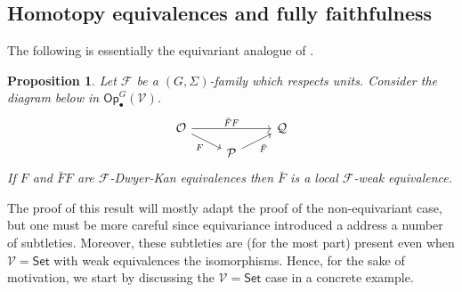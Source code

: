 \documentclass[a4paper,10pt
,draft
]{article}%
\numberwithin{equation}{section}
\numberwithin{figure}{section}
\newtheorem{proposition}[equation]{Proposition}%
\theoremstyle{definition} %
\newcommand{\F}{\ensuremath{\mathcal F}}
\newcommand{\V}{\ensuremath{\mathcal V}}
\renewcommand{\O}{\ensuremath{\mathcal O}}
\newcommand{\1}{\ensuremath{\mathbbm 1}}%
\begin{document}
\subsection{Homotopy equivalences and fully faithfulness}
\label{HMTYEQ SEC}

The following is essentially the equivariant analogue of
\cite[Lemma 4.14]{Cav}.

\begin{proposition}\label{23HARDCASE PROP}
Let $\F$ be a $(G,\Sigma)$-family which respects units. 
Consider the diagram below 
in $\mathsf{Op}^G_\bullet(\V)$.
\begin{equation}\label{23HARDDIAG EQ}
	\begin{tikzcd}[row sep=5pt]
		\O \arrow{rr}{\bar{F}F}
		\arrow{dr}[swap]{F}
	&&
		\mathcal{Q} 
	\\
	&
		\mathcal{P} \ar{ru}[swap]{\bar{F}}
	\end{tikzcd}
\end{equation}
If $F$ and $\bar{F}F$ are $\F$-Dwyer-Kan equivalences
then $\bar{F}$ is a local $\F$-weak equivalence.
\end{proposition}

The proof of this result will mostly adapt the proof of the non-equivariant case,
but one must be more careful since equivariance introduced a address a number of subtleties.
Moreover, these subtleties are (for the most part)
present even when $\V = \mathsf{Set}$
with weak equivalences the isomorphisms.
Hence, for the sake of motivation, 
we start by discussing the $\V = \mathsf{Set}$ case
in a concrete example.
\end{document}
